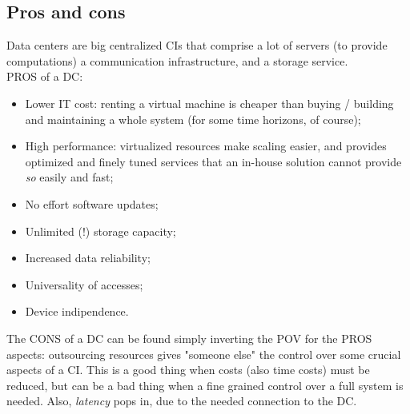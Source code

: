 \documentclass{article}
\begin{document}
			\subsection{Pros and cons}
				Data centers are big centralized CIs that comprise a lot of servers (to provide computations) a communication infrastructure, and a storage service.\\ 
				PROS of a DC:
				\begin{itemize}
					\item Lower IT cost: renting a virtual machine is cheaper than buying / building and maintaining a whole system (for some time horizons, of course);
					\item High performance: virtualized resources make scaling easier, and provides optimized and finely tuned services that an in-house solution cannot provide \emph{so} easily and fast;
					\item No effort software updates;
					\item Unlimited (!) storage capacity;
					\item Increased data reliability;
					\item Universality of accesses;
					\item Device indipendence.
				\end{itemize}
				The CONS of a DC can be found simply inverting the POV for the PROS aspects: outsourcing resources gives "someone else" the control over some crucial aspects of a CI. This is a good thing when costs (also time costs) must be reduced, but can be a bad thing when a fine grained control over a full system is needed. Also, \emph{latency} pops in, due to the needed connection to the DC.
				
\end{document}
